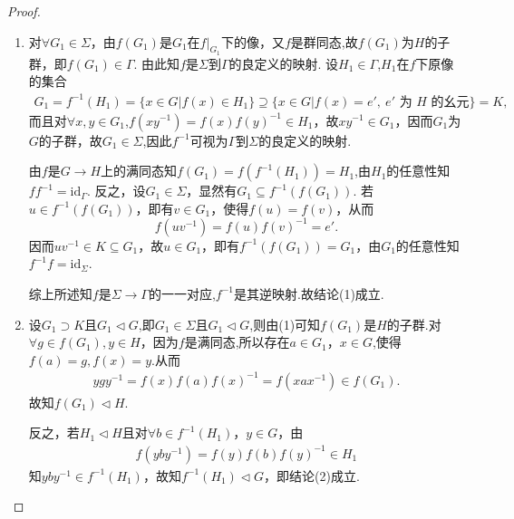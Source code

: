 \documentclass[../../main.tex]{subfiles}%
\begin{document}
\begin{proof}
\begin{enumerate}[(1)]
\item 对$\forall G_1 \in \Sigma$，由$f(G_1)$是$G_1$在$f|_{G_1}$下的像，又$f$是群同态,故$f(G_1)$为$H$的子群，即$f(G_1) \in \Gamma$. 由此知$f$是$\Sigma$到$\Gamma$的良定义的映射.
设$H_1 \in \Gamma$,$H_1$在$f$下原像的集合
\begin{align*}
G_1 = f^{-1}(H_1) = \{x \in G|f(x) \in H_1\}\supseteq \{x \in G|f(x) = e',\ e'\text{ 为 }H\text{ 的幺元}\} = K,
\end{align*}
而且对$\forall x,y \in G_1$,$f(xy^{-1}) = f(x)f(y)^{-1} \in H_1$，故$xy^{-1} \in G_1$，因而$G_1$为$G$的子群，故$G_1 \in \Sigma$,因此$f^{-1}$可视为$\Gamma$到$\Sigma$的良定义的映射.

由$f$是$G\to H$上的满同态知$f(G_1)=f(f^{-1}(H_1))=H_1$,由$H_1$的任意性知$ff^{-1}=\mathrm{id}_{\Gamma}$.
反之，设$G_1 \in \Sigma$，显然有$G_1 \subseteq f^{-1}(f(G_1))$. 若$u \in f^{-1}(f(G_1))$，即有$v \in G_1$，使得$f(u) = f(v)$，从而
$$
f(uv^{-1})=f(u)f(v)^{-1}=e'.
$$
因而$uv^{-1} \in K \subseteq G_1$，故$u \in G_1$，即有$f^{-1}(f(G_1)) = G_1$，由$G_1$的任意性知$f^{-1}f = \text{id}_\Sigma$.

综上所述知$f$是$\Sigma\to \Gamma$的一一对应,$f^{-1}$是其逆映射.故结论(1)成立.

\item 设$G_1 \supset K$且$G_1 \lhd G$,即$G_1\in \Sigma$且$G_1\lhd G$,则由(1)可知$f(G_1)$是$H$的子群.对$\forall g\in f(G_1),y\in H$，因为$f$是满同态,所以存在$a \in G_1$，$x \in G$,使得$f(a)=g,f(x)=y$.从而
\begin{align*}
ygy^{-1}=f(x)f(a)f(x)^{-1} = f(xax^{-1}) \in f(G_1).
\end{align*}
故知$f(G_1) \lhd H$.

反之，若$H_1 \lhd H$且对$\forall b \in f^{-1}(H_1)$，$y \in G$，由
\begin{align*}
f(yby^{-1}) = f(y)f(b)f(y)^{-1} \in H_1
\end{align*}
知$yby^{-1} \in f^{-1}(H_1)$，故知$f^{-1}(H_1) \lhd G$，即结论(2)成立.


\end{enumerate}
\end{proof}
\end{document}
